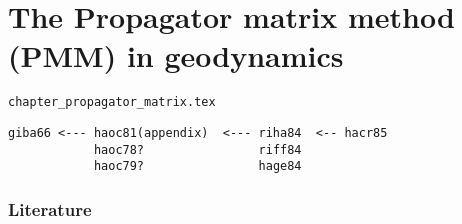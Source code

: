 \chapter{The Propagator matrix method (PMM) in geodynamics} 

\begin{flushright} {\tiny {\color{gray} \tt chapter\_propagator\_matrix.tex}} \end{flushright}

\begin{verbatim}
giba66 <--- haoc81(appendix)  <--- riha84  <-- hacr85 
            haoc78?                riff84
            haoc79?                hage84

\end{verbatim}

\subsection{Literature}


